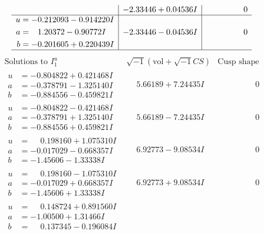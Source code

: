 \documentclass[1p]{elsarticle_modified}
\theoremstyle{definition}
\newcommand{\I}{\sqrt{-1}}
\begin{document}
$$\begin{array}{c|c|c}
 & -2.33446 + 0.04536 I & \phantom{-0.000000 } 0 \\ \hline\begin{aligned}
u &= -0.212093 - 0.914220 I \\
a &= \phantom{-}1.20372 - 0.90772 I \\
b &= -0.201605 + 0.220439 I\end{aligned}
 & -2.33446 - 0.04536 I & \phantom{-0.000000 } 0\\
 \hline 
 \end{array}$$\newpage$$\begin{array}{c|c|c}  
\text{Solutions to }I^u_{1}& \I (\text{vol} + \sqrt{-1}CS) & \text{Cusp shape}\\
 \hline 
\begin{aligned}
u &= -0.804822 + 0.421468 I \\
a &= -0.378791 - 1.325140 I \\
b &= -0.884556 - 0.459821 I\end{aligned}
 & \phantom{-}5.66189 + 7.24435 I & \phantom{-0.000000 } 0 \\ \hline\begin{aligned}
u &= -0.804822 - 0.421468 I \\
a &= -0.378791 + 1.325140 I \\
b &= -0.884556 + 0.459821 I\end{aligned}
 & \phantom{-}5.66189 - 7.24435 I & \phantom{-0.000000 } 0 \\ \hline\begin{aligned}
u &= \phantom{-}0.198160 + 1.075310 I \\
a &= -0.017029 - 0.668357 I \\
b &= -1.45606 - 1.33338 I\end{aligned}
 & \phantom{-}6.92773 - 9.08534 I & \phantom{-0.000000 } 0 \\ \hline\begin{aligned}
u &= \phantom{-}0.198160 - 1.075310 I \\
a &= -0.017029 + 0.668357 I \\
b &= -1.45606 + 1.33338 I\end{aligned}
 & \phantom{-}6.92773 + 9.08534 I & \phantom{-0.000000 } 0 \\ \hline\begin{aligned}
u &= \phantom{-}0.148724 + 0.891560 I \\
a &= -1.00500 + 1.31466 I \\
b &= \phantom{-}0.137345 - 0.196084 I\end{aligned}

\end{array}$$
\end{document}
